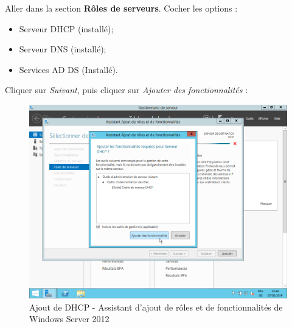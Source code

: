 \newpage
Aller dans la section \textbf{Rôles de serveurs}. Cocher les options :
\begin{itemize}
    \item Serveur DHCP (installé);
    \item Serveur DNS (installé);
    \item Services AD DS (Installé).
\end{itemize}
Cliquer sur \textit{Suivant}, puis cliquer sur \textit{Ajouter des fonctionnalités} :
\begin{figure}[h!]
    \begin{center}
        \includegraphics[scale=0.6]{WS2012_Screenshots/21.png}
        \caption{Ajout de DHCP - Assistant d'ajout de rôles et de fonctionnalités de Windows Server 2012}
        \label{WS2012_Screenshots/21}
    \end{center}
\end{figure}
\FloatBarrier

